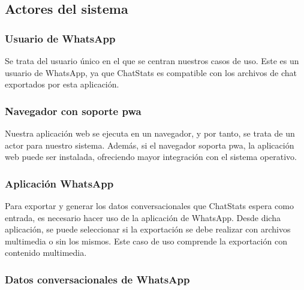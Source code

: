 \subsection{Actores del sistema}
\label{subsec:system-actors}

\subsubsection{Usuario de WhatsApp}

Se trata del usuario único en el que se centran nuestros casos de uso. Este es un usuario de WhatsApp, ya que ChatStats es compatible con los archivos de chat exportados por esta aplicación.

\subsubsection{Navegador con soporte \acrfull{pwa}}

Nuestra aplicación web se ejecuta en un navegador, y por tanto, se trata de un actor para nuestro sistema. Además, si el navegador soporta \acrfull{pwa}, la aplicación web puede ser instalada, ofreciendo mayor integración con el sistema operativo.

\subsubsection{Aplicación WhatsApp}

Para exportar y generar los datos conversacionales que ChatStats espera como entrada, es necesario hacer uso de la aplicación de WhatsApp. Desde dicha aplicación, se puede seleccionar si la exportación se debe realizar con archivos multimedia o sin los mismos. Este caso de uso comprende la exportación con contenido multimedia.

\subsubsection{Datos conversacionales de WhatsApp}

